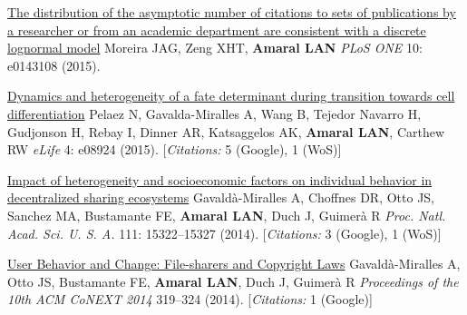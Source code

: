 \NumberedItem{\makebox[0.8cm][r]{[109]}}
\href{/people/amaral/distribution-asymptotic-number-citations-sets-publications-researcher-or-academic-department-are-consistent-discrete-lognormal-model}
{The distribution of the asymptotic number of citations to sets of  publications by a researcher or from an academic department are consistent with a discrete lognormal model}
\newline
Moreira JAG, Zeng XHT, {\textbf{Amaral LAN}}
\newline
\textit{PLoS ONE}
    10:
e0143108 (2015).
\newline
\Gap
~
\Gap

\NumberedItem{\makebox[0.8cm][r]{[108]}}
\href{/people/amaral/dynamics-and-heterogeneity-fate-determinant-during-transition-towards-cell-differentiation}
{Dynamics and heterogeneity of a fate determinant during transition towards cell differentiation}
\newline
Pelaez N, Gavalda-Miralles A, Wang B, Tejedor Navarro H, Gudjonson H, Rebay I, Dinner AR, Katsaggelos AK, {\textbf{Amaral LAN}}, Carthew RW
\newline
\textit{eLife}
    4:
e08924 (2015).
    [{\em{Citations:}} 5 (Google), 1 (WoS)]
\newline
\Gap
~
\Gap

\NumberedItem{\makebox[0.8cm][r]{[107]}}
\href{/people/amaral/impact-heterogeneity-and-socioeconomic-factors-individual-behavior-decentralized-sharing-ecosystems}
{Impact of heterogeneity and socioeconomic factors on individual behavior in decentralized sharing ecosystems}
\newline
Gavald\`a-Miralles A, Choffnes DR, Otto JS, Sanchez MA, Bustamante FE, {\textbf{Amaral LAN}}, Duch J, Guimer\`a R
\newline
\textit{Proc. Natl. Acad. Sci. U. S. A.}
    111:
15322--15327 (2014).
    [{\em{Citations:}} 3 (Google), 1 (WoS)]
\newline
\Gap
~
\Gap

\NumberedItem{\makebox[0.8cm][r]{[106]}}
\href{/people/amaral/user-behavior-and-change-file-sharers-and-copyright-laws}
{User Behavior and Change: File-sharers and Copyright Laws}
\newline
Gavald\`a-Miralles A, Otto JS, Bustamante FE, {\textbf{Amaral LAN}}, Duch J, Guimer\`a R
\newline
\textit{Proceedings of the 10th ACM CoNEXT 2014}
319--324 (2014).
    [{\em{Citations:}} 1 (Google)]
\newline
\Gap
~
\Gap

